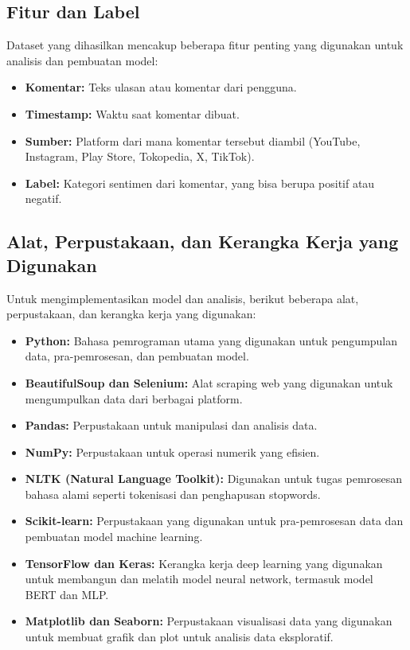 \documentclass[12pt,a4paper]{article}
\begin{document}
\subsection{Fitur dan Label}
Dataset yang dihasilkan mencakup beberapa fitur penting yang digunakan untuk analisis dan pembuatan model:

\begin{itemize}
    \item \textbf{Komentar:} Teks ulasan atau komentar dari pengguna.
    \item \textbf{Timestamp:} Waktu saat komentar dibuat.
    \item \textbf{Sumber:} Platform dari mana komentar tersebut diambil (YouTube, Instagram, Play Store, Tokopedia, X, TikTok).
    \item \textbf{Label:} Kategori sentimen dari komentar, yang bisa berupa positif atau negatif.
\end{itemize}

\subsection{Alat, Perpustakaan, dan Kerangka Kerja yang Digunakan}
Untuk mengimplementasikan model dan analisis, berikut beberapa alat, perpustakaan, dan kerangka kerja yang digunakan:

\begin{itemize}
    \item \textbf{Python:} Bahasa pemrograman utama yang digunakan untuk pengumpulan data, pra-pemrosesan, dan pembuatan model.
    \item \textbf{BeautifulSoup dan Selenium:} Alat scraping web yang digunakan untuk mengumpulkan data dari berbagai platform.
    \item \textbf{Pandas:} Perpustakaan untuk manipulasi dan analisis data.
    \item \textbf{NumPy:} Perpustakaan untuk operasi numerik yang efisien.
    \item \textbf{NLTK (Natural Language Toolkit):} Digunakan untuk tugas pemrosesan bahasa alami seperti tokenisasi dan penghapusan stopwords.
    \item \textbf{Scikit-learn:} Perpustakaan yang digunakan untuk pra-pemrosesan data dan pembuatan model machine learning.
    \item \textbf{TensorFlow dan Keras:} Kerangka kerja deep learning yang digunakan untuk membangun dan melatih model neural network, termasuk model BERT dan MLP.
    \item \textbf{Matplotlib dan Seaborn:} Perpustakaan visualisasi data yang digunakan untuk membuat grafik dan plot untuk analisis data eksploratif.
\end{itemize}
\end{document}
